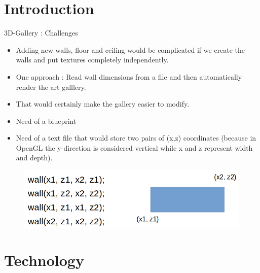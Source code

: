 \documentclass[color=usenames,dvipsnames]{beamer}
\begin{document}
\section{Introduction}

\begin{frame}{3D-Gallery : Challenges}

\begin{itemize}

  \setlength{\itemsep}{10pt}
  
\item Adding new walls, floor and ceiling would be complicated if we create the walls and put textures completely independently.  

\item One approach : Read wall dimensions from a file and then automatically render the art galllery.
  
\item That would certainly make the gallery easier to modify.

\item Need of a blueprint

\item Need of a text file that would store two pairs of (x,z) coordinates (because in OpenGL the y-direction is considered vertical while x and z represent width and depth).

\end{itemize}

\begin{figure}[h!]  
  \centering
  \includegraphics[width=.65\textwidth]{walls.png}  
  \end{figure} 

\end{frame}

\section{Technology}
\end{document}
